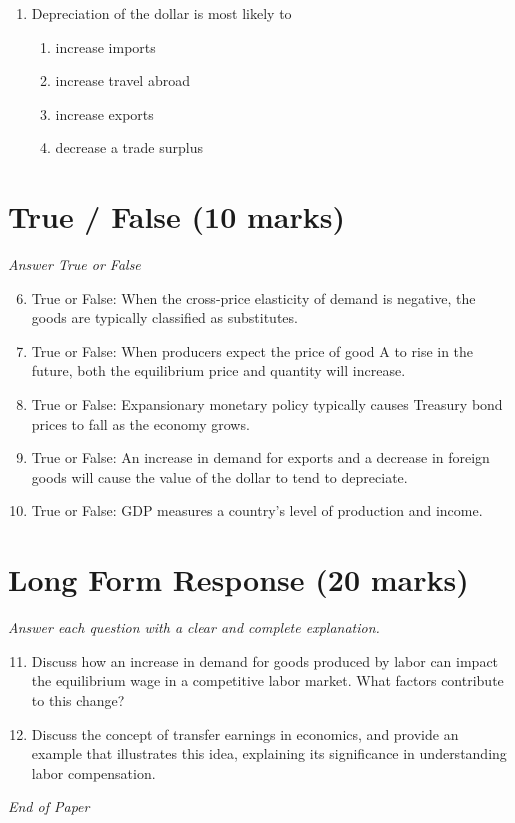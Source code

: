 \documentclass[12pt]{article}
\begin{document}
\begin{enumerate}[label=\arabic*.]
\begin{enumerate}[label=(\alph*)]
    \item an appreciation of the country's currency.
    \item low levels of income relative to other nations.
\end{enumerate}
\item Depreciation of the dollar is most likely to
\begin{enumerate}[label=(\alph*)]
    \item increase imports
    \item increase travel abroad
    \item increase exports
    \item decrease a trade surplus
\end{enumerate}
\end{enumerate}

\section*{True / False (10 marks)}
\textit{Answer True or False}
\begin{enumerate}[label=\arabic*.]
\setcounter{enumi}{5}
\item True or False: When the cross-price elasticity of demand is negative, the goods are typically classified as substitutes.
\item True or False: When producers expect the price of good A to rise in the future, both the equilibrium price and quantity will increase.
\item True or False: Expansionary monetary policy typically causes Treasury bond prices to fall as the economy grows.
\item True or False: An increase in demand for exports and a decrease in foreign goods will cause the value of the dollar to tend to depreciate.
\item True or False: GDP measures a country's level of production and income.
\end{enumerate}

\section*{Long Form Response (20 marks)}
\textit{Answer each question with a clear and complete explanation.}
\begin{enumerate}[label=\arabic*.]
\setcounter{enumi}{10}
\item Discuss how an increase in demand for goods produced by labor can impact the equilibrium wage in a competitive labor market. What factors contribute to this change?
\item Discuss the concept of transfer earnings in economics, and provide an example that illustrates this idea, explaining its significance in understanding labor compensation.
\end{enumerate}

\vfill
\noindent\textit{End of Paper}
\end{document}
